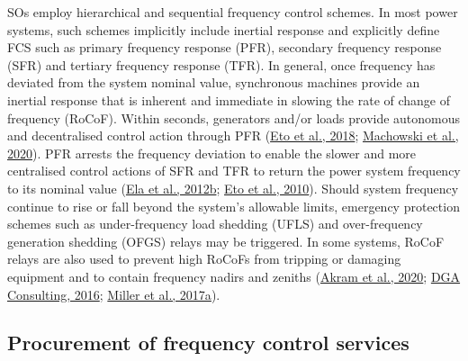 \documentclass[12pt,a4paper,]{report}
\begin{document}
SOs employ hierarchical and sequential frequency control schemes. In
most power systems, such schemes implicitly include inertial response
and explicitly define FCS such as primary frequency response (PFR),
secondary frequency response (SFR) and tertiary frequency response
(TFR). In general, once frequency has deviated from the system nominal
value, synchronous machines provide an inertial response that is
inherent and immediate in slowing the rate of change of frequency
(RoCoF). Within seconds, generators and/or loads provide autonomous and
decentralised control action through PFR
(\protect\hyperlink{ref-etoFrequencyControlRequirements2018}{Eto et al.,
2018};
\protect\hyperlink{ref-machowskiPowerSystemDynamics2020}{Machowski et
al., 2020}). PFR arrests the frequency deviation to enable the slower
and more centralised control actions of SFR and TFR to return the power
system frequency to its nominal value
(\protect\hyperlink{ref-elaAlternativeApproachesIncentivizing2012}{Ela
et al., 2012b}; \protect\hyperlink{ref-etoUseFrequencyResponse2010}{Eto
et al., 2010}). Should system frequency continue to rise or fall beyond
the system's allowable limits, emergency protection schemes such as
under-frequency load shedding (UFLS) and over-frequency generation
shedding (OFGS) relays may be triggered. In some systems, RoCoF relays
are also used to prevent high RoCoFs from tripping or damaging equipment
and to contain frequency nadirs and zeniths
(\protect\hyperlink{ref-akramEnergyStorageShortTerm2020}{Akram et al.,
2020};
\protect\hyperlink{ref-dgaconsultingInternationalReviewFrequency2016}{DGA
Consulting, 2016};
\protect\hyperlink{ref-millerAdvisoryEquipmentLimits2017}{Miller et al.,
2017a}).

\hypertarget{sec:fcs-context-procurement}{%
\subsection{Procurement of frequency control
services}\label{sec:fcs-context-procurement}}
\end{document}
